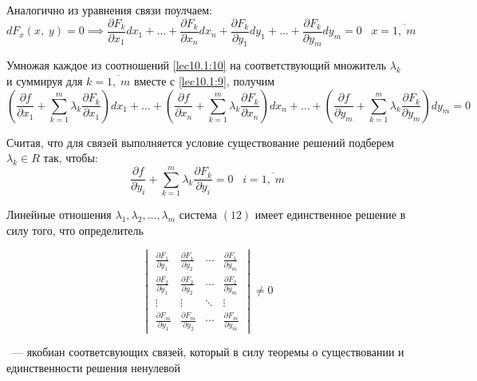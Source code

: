 \documentclass[../../main.tex]{subfiles}
\begin{document}
	Аналогично из уравнения связи поулчаем:
	\begin{equation}
	dF_x\left(x, \; y\right) = 0 \implies \dfrac{\partial F_k}{\partial x_1}dx_1 + 
	\ldots + \dfrac{\partial F_k}{\partial x_n}dx_n + 
	\dfrac{\partial F_k}{\partial y_1}dy_1 + \ldots + 
	\dfrac{\partial F_k}{\partial y_m}dy_m = 0 \;\;\; x = \overline{1, \; m} 
	\label{lec10.1:10}
	\end{equation}
	
	Умножая каждое из соотношений \eqref{lec10.1:10} на соответствующий множитель 
	$\lambda_k$ и суммируя для $k = \overline{1,\;m}$ 
	вместе с \eqref{lec10.1:9}, получим
	\begin{equation}
	\left(\dfrac{\partial f}{\partial x_1} + \sum\limits_{k = 1}^m \lambda_k \dfrac{\partial F_k}{\partial x_1} \right)dx_1 + \ldots + \left(\dfrac{\partial f}{\partial x_n} + \sum\limits_{k = 1}^m \lambda_k \dfrac{\partial F_k}{\partial x_n} \right)dx_n + \ldots + \left(\dfrac{\partial f}{\partial y_m} + \sum\limits_{k = 1}^m \lambda_k \dfrac{\partial F_k}{\partial y_m} \right)dy_m = 0 \label{lec10.1:11}
	\end{equation}
	
	Считая, что для связей выполняется условие существование 
	решений подберем $\lambda_k \in R$ так, чтобы:
	\begin{equation}
	\dfrac{\partial f}{\partial y_i} + \sum\limits_{k = 1}^m \lambda_k 
	\dfrac{\partial F_k}{\partial y_i} = 0 \;\;\; i = \overline{1, \; m} 
	\label{lec10.1:12}
	\end{equation}
	
	Линейные отношения $\lambda_1, \lambda_2, \ldots, \lambda_m$ система 
	$\left( 12 \right) $ %
	имеет единственное решение в силу того, что определитель
	
	\[
	\label{QQQQQQQQQQQQQQQQQQQQQQQQQQQQQQQQQQkek_label_1}
	\begin{vmatrix}
	\frac{\partial F_1}{\partial y_1} & \frac{\partial F_1}{\partial y_2}
	& \cdots & \frac{\partial F_1}{\partial y_m} \\
	\frac{\partial F_2}{\partial y_1} & \frac{\partial F_2}{\partial y_2} 
	& \cdots & \frac{\partial F_2}{\partial y_m} \\
	\vdots  & \vdots  & \ddots & \vdots  \\
	\frac{\partial F_m}{\partial y_1} & \frac{\partial F_m}{\partial y_2}
	& \cdots & \frac{\partial F_m}{\partial y_m}
	\end{vmatrix} \ne 0 
	\]
	\smallskip
	
	~--- якобиан соответсвующих связей, который в силу теоремы о существовании
	и единственности решения ненулевой 
	
\end{document}
